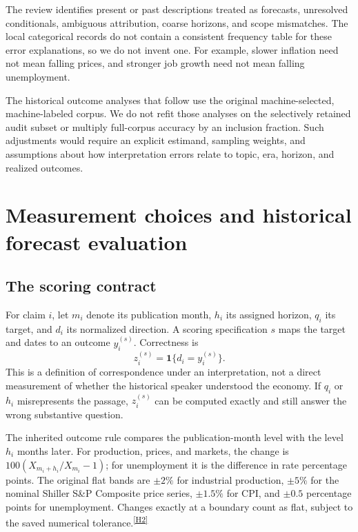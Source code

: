 \documentclass[iicol,pdflatex,sn-mathphys-num]{sn-jnl}
\newcommand{\evidence}[1]{\textsuperscript{\hyperref[app:evidence]{[#1]}}}
\begin{document}
The review identifies present or past descriptions treated as forecasts, unresolved conditionals, ambiguous attribution, coarse horizons, and scope mismatches. The local categorical records do not contain a consistent frequency table for these error explanations, so we do not invent one. For example, slower inflation need not mean falling prices, and stronger job growth need not mean falling unemployment.

The historical outcome analyses that follow use the original machine-selected, machine-labeled corpus. We do not refit those analyses on the selectively retained audit subset or multiply full-corpus accuracy by an inclusion fraction. Such adjustments would require an explicit estimand, sampling weights, and assumptions about how interpretation errors relate to topic, era, horizon, and realized outcomes.

\section{Measurement choices and historical forecast evaluation}
\subsection{The scoring contract}
For claim $i$, let $m_i$ denote its publication month, $h_i$ its assigned horizon, $q_i$ its target, and $d_i$ its normalized direction. A scoring specification $s$ maps the target and dates to an outcome $y_i^{(s)}$. Correctness is
\begin{equation}
 z_i^{(s)}=\mathbf{1}\{d_i=y_i^{(s)}\}.
 \label{eq:correct}
\end{equation}
This is a definition of correspondence under an interpretation, not a direct measurement of whether the historical speaker understood the economy. If $q_i$ or $h_i$ misrepresents the passage, $z_i^{(s)}$ can be computed exactly and still answer the wrong substantive question.

The inherited outcome rule compares the publication-month level with the level $h_i$ months later. For production, prices, and markets, the change is $100(X_{m_i+h_i}/X_{m_i}-1)$; for unemployment it is the difference in rate percentage points. The original flat bands are $\pm2\%$ for industrial production, $\pm5\%$ for the nominal Shiller S\&P Composite price series, $\pm1.5\%$ for CPI, and $\pm0.5$ percentage points for unemployment. Changes exactly at a boundary count as flat, subject to the saved numerical tolerance.\evidence{H2}
\end{document}
